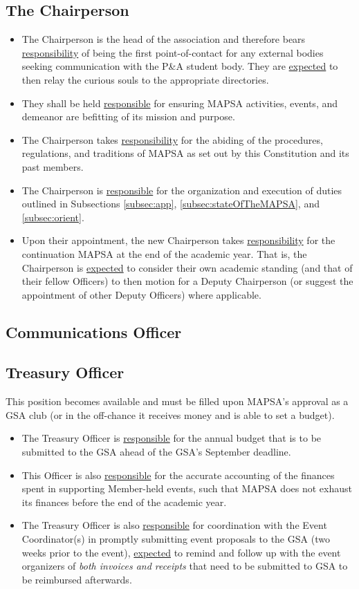 \documentclass[8pt]{article}
\begin{document}
	\subsection{The Chairperson}
	\begin{itemize}
		\item The Chairperson is the head of the association and therefore bears \underline{responsibility} of being the first point-of-contact for any external bodies seeking communication with the P\&A student body. They are \underline{expected} to then relay the curious souls to the appropriate directories. 
		\item They shall be held \underline{responsible} for ensuring MAPSA activities, events, and demeanor are befitting of its mission and purpose. 
		\item The Chairperson takes \underline{responsibility} for the abiding of the procedures, regulations, and traditions of MAPSA as set out by this Constitution and its past members.
		\item The Chairperson is \underline{responsible} for the organization and execution of duties outlined in Subsections \ref{subsec:app}, \ref{subsec:stateOfTheMAPSA}, and \ref{subsec:orient}.
		\item Upon their appointment, the new Chairperson takes \underline{responsibility} for the continuation MAPSA at the end of the academic year. That is, the Chairperson is \underline{expected} to consider their own academic standing (and that of their fellow Officers) to then motion for a Deputy Chairperson (or suggest the appointment of other Deputy Officers) where applicable.
	\end{itemize}
	\subsection{Communications Officer}
	\subsection{Treasury Officer}
	This position becomes available and must be filled upon MAPSA's approval as a GSA club (or in the off-chance it receives money and is able to set a budget). 
 	\begin{itemize}
		\item The Treasury Officer is \underline{responsible} for the annual budget that is to be submitted to the GSA ahead of the GSA's September deadline. 
		\item This Officer is also \underline{responsible} for the accurate accounting of the finances spent in supporting Member-held events, such that MAPSA does not exhaust its finances before the end of the academic year. 
		\item The Treasury Officer is also \underline{responsible} for coordination with the Event Coordinator(s) in promptly submitting event proposals to the GSA (two weeks prior to the event), \underline{expected} to remind and follow up with the event organizers of \textit{both invoices and receipts} that need to be submitted to GSA to be reimbursed afterwards.
	\end{itemize}
\end{document}

